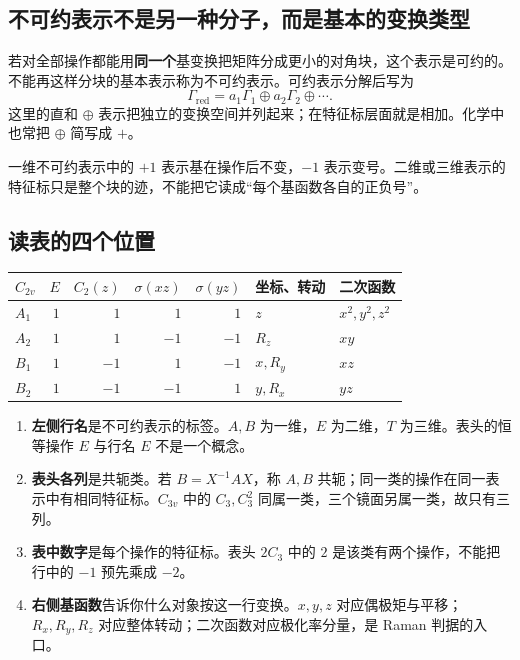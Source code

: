 \subsection{不可约表示不是另一种分子，而是基本的变换类型}
若对全部操作都能用\textbf{同一个}基变换把矩阵分成更小的对角块，这个表示是可约的。不能再这样分块的基本表示称为不可约表示。可约表示分解后写为
\[
 \Gamma_{\mathrm{red}}=a_1\Gamma_1\oplus a_2\Gamma_2\oplus\cdots.
\]
这里的直和 $\oplus$ 表示把独立的变换空间并列起来；在特征标层面就是相加。化学中也常把 $\oplus$ 简写成 $+$。

一维不可约表示中的 $+1$ 表示基在操作后不变，$-1$ 表示变号。二维或三维表示的特征标只是整个块的迹，不能把它读成“每个基函数各自的正负号”。

\subsection{读表的四个位置}
\begin{center}
\small
\begin{tabular}{@{}l rrrr ll@{}}
\toprule
$C_{2v}$ & $E$ & $C_2(z)$ & $\sigma(xz)$ & $\sigma(yz)$ & 坐标、转动 & 二次函数 \\
\midrule
$A_1$ & $1$ & $1$ & $1$ & $1$ & $z$ & $x^2,y^2,z^2$ \\
$A_2$ & $1$ & $1$ & $-1$ & $-1$ & $R_z$ & $xy$ \\
$B_1$ & $1$ & $-1$ & $1$ & $-1$ & $x,R_y$ & $xz$ \\
$B_2$ & $1$ & $-1$ & $-1$ & $1$ & $y,R_x$ & $yz$ \\
\bottomrule
\end{tabular}
\end{center}

\begin{enumerate}
\item \textbf{左侧行名}是不可约表示的标签。$A,B$ 为一维，$E$ 为二维，$T$ 为三维。表头的恒等操作 $E$ 与行名 $E$ 不是一个概念。
\item \textbf{表头各列}是共轭类。若 $B=X^{-1}AX$，称 $A,B$ 共轭；同一类的操作在同一表示中有相同特征标。$C_{3v}$ 中的 $C_3,C_3^2$ 同属一类，三个镜面另属一类，故只有三列。
\item \textbf{表中数字}是每个操作的特征标。表头 $2C_3$ 中的 $2$ 是该类有两个操作，不能把行中的 $-1$ 预先乘成 $-2$。
\item \textbf{右侧基函数}告诉你什么对象按这一行变换。$x,y,z$ 对应偶极矩与平移；$R_x,R_y,R_z$ 对应整体转动；二次函数对应极化率分量，是 Raman 判据的入口。
\end{enumerate}

